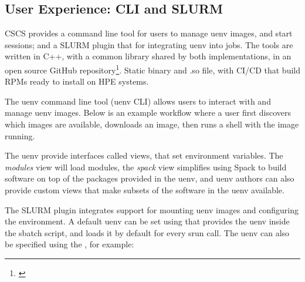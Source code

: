 \subsection{User Experience: CLI and SLURM}
\label{sec:cli}

CSCS provides a command line tool for users to manage uenv images, and start sessions; and a SLURM plugin that for integrating uenv into jobs.
The tools are written in C++, with a common library shared by both implementations, in an open source GitHub repository\footnote{\href{https://github.com/eth-cscs/uenv2}{}}.
Static binary and .so file, with CI/CD that build RPMs ready to install on HPE systems.

The uenv command line tool (uenv CLI) allows users to interact with and manage uenv images.
Below is an example workflow where a user first discovers which images are available, downloads an image, then runs a shell with the image running.



The uenv provide interfaces called views, that set environment variables.
The \emph{modules} view will load modules, the \emph{spack} view simplifies using Spack to build software on top of the packages provided in the uenv, and uenv authors can also provide custom views that make subsets of the software in the uenv available.

The SLURM plugin integrates support for mounting uenv images and configuring the environment.
A default uenv can be set using  that provides the uenv inside the sbatch script, and loads it by default for every srun call.
The uenv can also be specified using the , for example:


